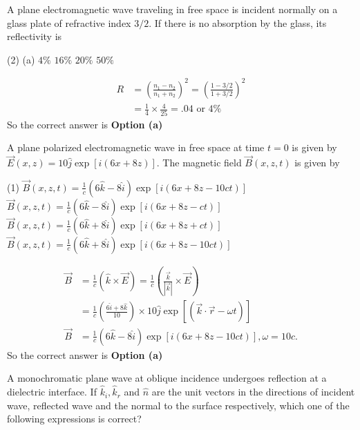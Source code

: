 \begin{enumerate}
\begin{minipage}{\textwidth}
		\item A plane electromagnetic wave traveling in free space is incident normally on a glass plate of refractive index $3 / 2 .$ If there is no absorption by the glass, its reflectivity is
	\end{minipage}
	\begin{tasks}(2)
		\task[\textbf{a.}](a) $4 \%$
		\task[\textbf{b.}] $16 \%$
		\task[\textbf{c.}]$20 \%$
		\task[\textbf{d.}]$50 \%$
	\end{tasks}
\begin{answer}
	\begin{align*}
	R&=\left(\frac{n_{1}-n_{2}}{n_{1}+n_{2}}\right)^{2}=\left(\frac{1-3 / 2}{1+3 / 2}\right)^{2}\\&=\frac{1}{4} \times \frac{4}{25}=.04\text{ or }4 \%
	\end{align*}
	So the correct answer is \textbf{Option (a)}
\end{answer}
	\begin{minipage}{\textwidth}
		\item A plane polarized electromagnetic wave in free space at time $t=0$ is given by $\vec{E}(x, z)=10 \hat{j} \exp [i(6 x+8 z)] .$ The magnetic field $\vec{B}(x, z, t)$ is given by
	\end{minipage}
	\begin{tasks}(1)
		\task[\textbf{a.}] $\vec{B}(x, z, t)=\frac{1}{c}(6 \hat{k}-8 \hat{i}) \exp [i(6 x+8 z-10 c t)]$ 
		\task[\textbf{b.}]$\vec{B}(x, z, t)=\frac{1}{c}(6 \hat{k}-8 \hat{i}) \exp [i(6 x+8 z-c t)]$
		\task[\textbf{c.}]$\vec{B}(x, z, t)=\frac{1}{c}(6 \hat{k}+8 \hat{i}) \exp [i(6 x+8 z+c t)]$
		\task[\textbf{d.}]$\vec{B}(x, z, t)=\frac{1}{c}(6 \hat{k}+8 \hat{i}) \exp [i(6 x+8 z-10 c t)]$
	\end{tasks}
\begin{answer}
	\begin{align*}
	\vec{B}&=\frac{1}{c}(\hat{k} \times \vec{E})=\frac{1}{c}\left(\frac{\vec{k}}{|\vec{k}|} \times \vec{E}\right)\\
	&=\frac{1}{c}\left(\frac{6 \hat{i}+8 \hat{k}}{10}\right) \times 10 \hat{j} \exp [(\vec{k} \cdot \vec{r}-\omega t)]\\
	\vec{B}&=\frac{1}{c}(6 \hat{k}-8 \hat{i}) \exp [i(6 x+8 z-10 c t)], \omega=10 c .
	\end{align*}
	So the correct answer is \textbf{Option (a)}
\end{answer}
	\begin{minipage}{\textwidth}
		\item A monochromatic plane wave at oblique incidence undergoes reflection at a dielectric interface. If $\hat{k}_{i}, \hat{k}_{r}$ and $\hat{n}$ are the unit vectors in the directions of incident wave, reflected wave and the normal to the surface respectively, which one of the following expressions is correct?

\end{minipage}
\end{enumerate}
